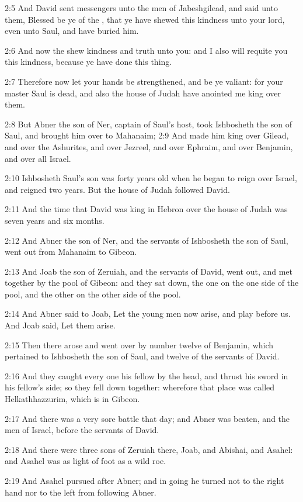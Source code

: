 2:5 And David sent messengers unto the men of Jabeshgilead, and said
unto them, Blessed be ye of the \LORD, that ye have shewed this
kindness unto your lord, even unto Saul, and have buried him.

2:6 And now the \LORD shew kindness and truth unto you: and I also will
requite you this kindness, because ye have done this thing.

2:7 Therefore now let your hands be strengthened, and be ye valiant:
for your master Saul is dead, and also the house of Judah have
anointed me king over them.

2:8 But Abner the son of Ner, captain of Saul's host, took Ishbosheth
the son of Saul, and brought him over to Mahanaim; 2:9 And made him
king over Gilead, and over the Ashurites, and over Jezreel, and over
Ephraim, and over Benjamin, and over all Israel.

2:10 Ishbosheth Saul's son was forty years old when he began to reign
over Israel, and reigned two years. But the house of Judah followed
David.

2:11 And the time that David was king in Hebron over the house of
Judah was seven years and six months.

2:12 And Abner the son of Ner, and the servants of Ishbosheth the son
of Saul, went out from Mahanaim to Gibeon.

2:13 And Joab the son of Zeruiah, and the servants of David, went out,
and met together by the pool of Gibeon: and they sat down, the one on
the one side of the pool, and the other on the other side of the pool.

2:14 And Abner said to Joab, Let the young men now arise, and play
before us. And Joab said, Let them arise.

2:15 Then there arose and went over by number twelve of Benjamin,
which pertained to Ishbosheth the son of Saul, and twelve of the
servants of David.

2:16 And they caught every one his fellow by the head, and thrust his
sword in his fellow's side; so they fell down together: wherefore that
place was called Helkathhazzurim, which is in Gibeon.

2:17 And there was a very sore battle that day; and Abner was beaten,
and the men of Israel, before the servants of David.

2:18 And there were three sons of Zeruiah there, Joab, and Abishai,
and Asahel: and Asahel was as light of foot as a wild roe.

2:19 And Asahel pursued after Abner; and in going he turned not to the
right hand nor to the left from following Abner.

